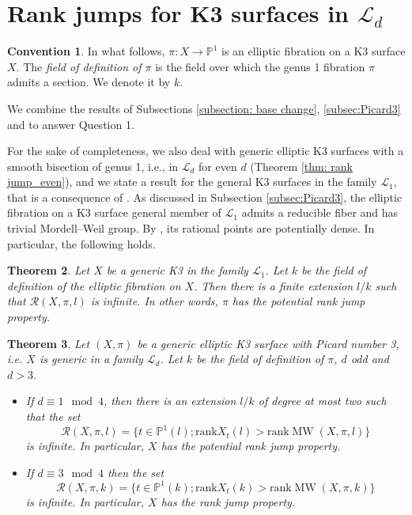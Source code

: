 \documentclass{amsart}
\newtheorem{theorem}{Theorem}[section]
\theoremstyle{definition}
\newtheorem{convention}[theorem]{Convention}
\numberwithin{equation}{section}
\DeclareMathOperator{\MW}{MW}
\begin{document}
\section{Rank jumps for K3 surfaces in $\mathcal{L}_d$}\label{section: rank jump}



\begin{convention} In what follows, $\pi: X\rightarrow \mathbb{P}^1$ is an elliptic fibration on a K3 surface $X$. The \textit{field of definition of $\pi$} is the field over which  the genus 1 fibration $\pi$ admits a section. We denote it by $k$.
\end{convention}
We combine the results of Subsections \ref{subsection: base change}, \ref{subsec:Picard3} and \cite{PastenSalgado} to answer Question 1.



For the sake of completeness, we also deal with generic elliptic K3 surfaces with a smooth bisection of genus 1, i.e., in $\mathcal{L}_d$ for even $d$ (Theorem \ref{thm: rank jump_even}), and we state a result for the general K3 surfaces in the family $\mathcal{L}_1$, that is a consequence of \cite{BT}. As discussed in Subsection \ref{subsec:Picard3}, the elliptic fibration on a K3 surface general member of $\mathcal{L}_1$ admits a reducible fiber and has trivial Mordell--Weil group. By \cite[Theorem 1.1]{BT}, its rational points are potentially dense. In particular, the following holds.
\begin{theorem}\label{teorema:aut_finito}
Let $X$ be a generic K3 in the family $\mathcal{L}_1$. Let $k$ be the field of definition of the elliptic fibration on $X$. Then there is a finite extension $l/k$ such that 
$\mathcal{R}(X,\pi, l)$ is infinite. In other words, $\pi$ has the potential rank jump property.
\end{theorem}


\begin{theorem}\label{thm: rank jump odd d}
Let $(X, \pi)$ be a generic elliptic K3 surface with Picard number 3, i.e. $X$ is generic in a family $\mathcal{L}_d$.  Let $k$ be the field of definition of $\pi$, $d$ odd and $d>3$. 
\begin{itemize}
\item 
If $d\equiv 1\mod 4$, then there is an extension $l/k$ of degree at most two such that the set 
\[
\mathcal{R}(X,\pi, l)=\{t\in \mathbb{P}^1(l); \mathrm{rank} X_t(l)>\mathrm{rank} \MW(X,\pi,l)\}
\] is infinite. 
In particular, $X$ has the potential rank jump property.
\item If $d\equiv 3\mod 4$ then the set 
\[
\mathcal{R}(X,\pi, k)=\{t\in \mathbb{P}^1(k); \mathrm{rank} X_t(k)> \mathrm{rank} \MW(X,\pi,k)\}
\] is infinite. 
In particular,   $X$ has the rank jump property. 
\end{itemize}
\end{theorem}
\end{document}
